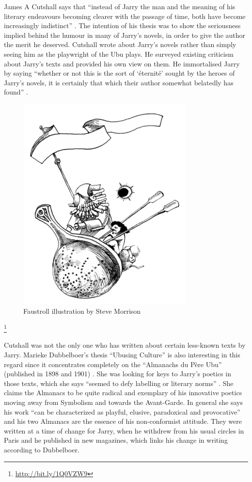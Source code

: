 James A Cutshall says that ``instead of Jarry the man and the meaning of his literary endeavours becoming clearer with the passage of time, both have become increasingly indistinct'' \citep[p.246]{Cutshall1988}. The intention of his thesis was to show the seriousness implied behind the humour in many of Jarry's novels, in order to give the author the merit he deserved. Cutshall wrote about Jarry's novels rather than simply seeing him as the playwright of the Ubu plays. He surveyed existing criticism about Jarry's texts and provided his own view on them. He immortalised Jarry by saying ``whether or not this is the sort of `éternité' sought by the heroes of Jarry's novels, it is certainly that which their author somewhat belatedly has found'' \citep[p.248]{Cutshall1988}.

\begin{figure}[htb]
  \centering
  \includegraphics[height=0.3\textheight]{images/faustroll}
  \caption[Faustroll]{Faustroll illustration by Steve Morrison}
\label{fig:FAUSTROLL}
\end{figure}\footnote{\url{http://bit.ly/1Q0VZW9}} %

Cutshall was not the only one who has written about certain less-known texts by Jarry. Marieke Dubbelboer's thesis ``Ubusing Culture'' is also interesting in this regard since it concentrates completely on the ``Almanachs du Père Ubu'' (published in 1898 and 1901) \citep{Dubbelboer2009}. She was looking for keys to Jarry's poetics in those texts, which she says ``seemed to defy labelling or literary norms'' \citep[p.10]{Dubbelboer2009}. She claims the Almanacs to be quite radical and exemplary of his innovative poetics moving away from Symbolism and towards the Avant-Garde. In general she says his work ``can be characterized as playful, elusive, paradoxical and provocative'' \citep[p.197]{Dubbelboer2009} and his two Almanacs are the essence of his non-conformist attitude. They were written at a time of change for Jarry, when he withdrew from his usual circles in Paris and he published in new magazines, which links his change in writing according to Dubbelboer.

